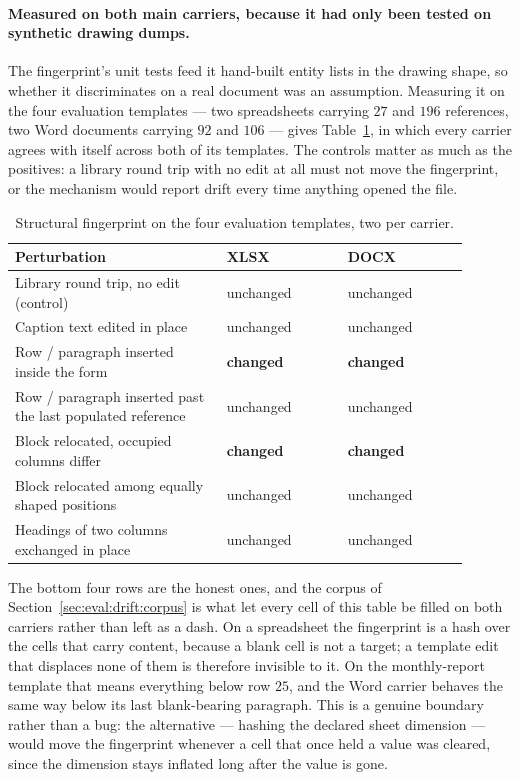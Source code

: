 \paragraph{Measured on both main carriers, because it had only been tested on synthetic drawing
dumps.}
The fingerprint's unit tests feed it hand-built entity lists in the drawing shape, so whether it
discriminates on a real document was an assumption. Measuring it on the four evaluation
templates --- two spreadsheets carrying $27$ and $196$ references, two Word documents carrying
$92$ and $106$ --- gives Table~\ref{tab:design:fingerprint}, in which every carrier agrees with
itself across both of its templates. The controls matter as much as the positives: a library
round trip with no edit at all must not move the fingerprint, or the mechanism would report
drift every time anything opened the file.

\begin{table}[htbp]
\centering
\caption{Structural fingerprint on the four evaluation templates, two per carrier.}
\label{tab:design:fingerprint}
\begin{tabular}{p{0.42\linewidth}p{0.24\linewidth}p{0.24\linewidth}}
\hline
\textbf{Perturbation} & \textbf{XLSX} & \textbf{DOCX} \\
\hline
Library round trip, no edit (control) & unchanged & unchanged \\
Caption text edited in place & unchanged & unchanged \\
Row / paragraph inserted inside the form & \textbf{changed} & \textbf{changed} \\
Row / paragraph inserted past the last populated reference & unchanged & unchanged \\
Block relocated, occupied columns differ & \textbf{changed} & \textbf{changed} \\
Block relocated among equally shaped positions & unchanged & unchanged \\
Headings of two columns exchanged in place & unchanged & unchanged \\
\hline
\end{tabular}
\end{table}

The bottom four rows are the honest ones, and the corpus of
Section~\ref{sec:eval:drift:corpus} is what let every cell of this table be filled on both
carriers rather than left as a dash. On a spreadsheet the fingerprint is a hash over the cells
that carry content, because a blank cell is not a target; a template edit that displaces none of
them is therefore invisible to it. On the monthly-report template that means everything below
row $25$, and the Word carrier behaves the same way below its last blank-bearing paragraph. This
is a genuine boundary rather than a bug: the alternative --- hashing the declared sheet dimension
--- would move the fingerprint whenever a cell that once held a value was cleared, since the
dimension stays inflated long after the value is gone.

